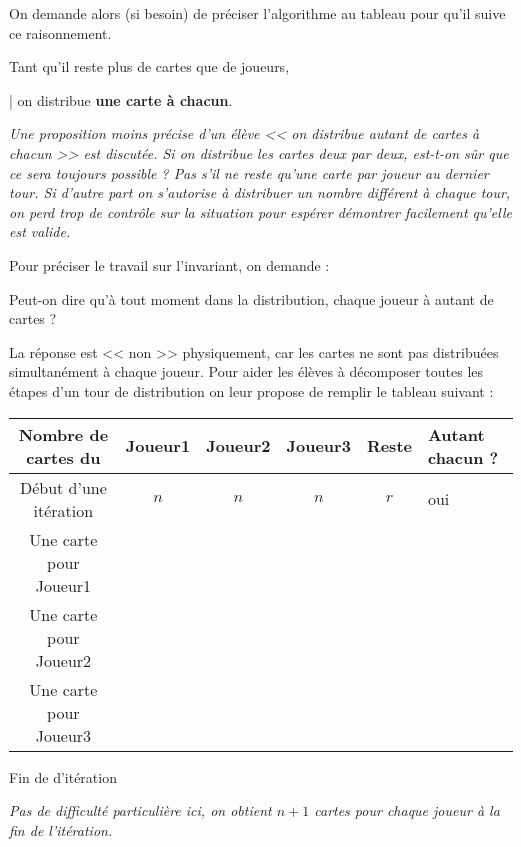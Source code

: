 On demande alors (si besoin) de préciser l'algorithme au tableau pour qu'il suive ce raisonnement. 

\begin{exemple}[title = Au tableau]{}{}
Tant qu'il reste plus de cartes que de joueurs,

\quad | \quad    on distribue {\bfseries une carte à chacun}.
\end{exemple}

\textit{Une proposition moins précise d'un élève << on distribue autant de cartes à chacun >> est discutée. Si on distribue les cartes deux par deux, est-t-on sûr que ce sera toujours possible ? Pas s'il ne reste qu'une carte par joueur au dernier tour. Si d'autre part on s'autorise à distribuer un nombre différent à chaque tour, on perd trop de contrôle sur la situation pour espérer démontrer facilement qu'elle est valide.}

Pour préciser le travail sur l'invariant, on demande :

\begin{question} Peut-on dire qu'à tout moment dans la distribution, chaque joueur à autant de cartes ? \end{question}

La réponse est << non >> physiquement, car les cartes ne sont pas distribuées simultanément à chaque joueur. Pour aider les élèves à décomposer toutes les étapes d'un tour de distribution on leur propose de remplir le tableau suivant :

\begin{exemple}[title = Au tableau]{}{}
\begin{center}
\begin{tabular}{|c|c|c|c|c|l}
\cline{1-5}
\bfseries Nombre de cartes du     & Joueur1 & Joueur2 & Joueur3 & Reste & Autant chacun ?\\
\hline
Début d'une itération   & $n$ & $n$ & $n$ &  $r$  & oui\\
Une carte pour Joueur1 &     &     &     &    &\\
Une carte pour Joueur2 &     &     &     &    &\\
Une carte pour Joueur3 &     &     &     &   & \\
\cline{1-5}
\end{tabular}

Fin de d'itération
\end{center}
\end{exemple}

\textit{Pas de difficulté particulière ici, on obtient $n+1$ cartes pour chaque joueur à la fin de l'itération.}


